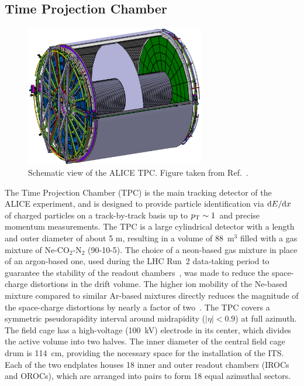 \subsection{Time Projection Chamber}
\begin{figure}
    \centering
    \includegraphics[width=0.7\textwidth]{Figures/Chapter 3/TPC_Scheme.png}
    \caption{Schematic view of the ALICE TPC. Figure taken from Ref.~\cite{ALICE:2023udb}.}
    \label{fig:TPC}
\end{figure}
The Time Projection Chamber (TPC) is the main tracking detector of the ALICE experiment, and is designed to provide particle identification via $\mathrm{d} E/\mathrm{d} x$ of charged particles on a track-by-track basis up to $p_\mathrm{T}\sim1$~\gevc and precise momentum measurements. The TPC is a large cylindrical detector with a length and outer diameter of about 5 m, resulting in a volume of 88~m$^3$ filled with a gas mixture of Ne-CO$_2$-N$_2$ (90-10-5). The choice of a neon-based gas mixture in place of an argon-based one, used during the LHC Run~2 data-taking period to guarantee the stability of the readout chambers~\cite{Lippmann:2014lay}, was made to reduce the space-charge distortions in the drift volume. The higher ion mobility of the Ne-based mixture compared to similar Ar-based mixtures directly reduces the magnitude of the space-charge distortions by nearly a factor of two~\cite{Deisting:2016guq}. The TPC covers a symmetric pseudorapidity interval around midrapidity ($\lvert\eta\rvert < 0.9$) at full azimuth. The field cage has a high-voltage (100~kV) electrode in its center, which divides the active volume into two halves. The inner diameter of the central field cage drum is 114~cm, providing the necessary space for the installation of the ITS.  Each of the two endplates houses 18 inner and outer readout chambers (IROCs and OROCs), which are arranged into pairs to form 18 equal azimuthal sectors.

